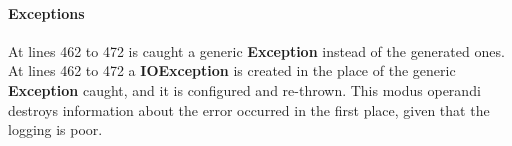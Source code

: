 
\paragraph{Exceptions}
\begin{itemize}
		At lines 462 to 472 is caught a generic \textbf{Exception} instead of the generated ones.
		At lines 462 to 472 a \textbf{IOException} is created in the place of the generic \textbf{Exception} caught, and it is configured and re-thrown.
		This modus operandi destroys information about the error occurred in the first place, given that the logging is poor.
\end{itemize}


